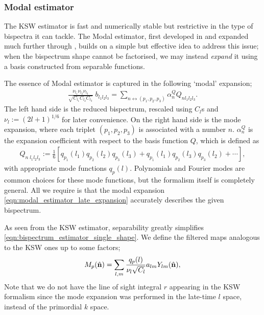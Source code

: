 \subsubsection*{Modal estimator}
The KSW estimator is fast and numerically stable but restrictive in the type of bispectra it can tackle. The Modal estimator, first developed in \cite{Fergusson2010general} and expanded much further through \cite{Fergusson2012,Fergusson2014,Shiraishi2014parityodd,Shiraishi2019cross}, builds on a simple but effective idea to address this issue; when the bispectrum shape cannot be factorised, we may instead \textit{expand} it using a basis constructed from separable functions.

The essence of Modal estimator is captured in the following `modal' expansion;
\begin{align}
	\frac{\nu_{l_1} \nu_{l_2} \nu_{l_3}}{\sqrt{C_{l_1} C_{l_2} C_{l_3}}} \; b_{l_1 l_2 l_3} = \sum_{n \leftrightarrow (p_1,p_2,p_3)} \alpha_n^Q Q_{n l_1 l_2 l_3}. \label{eqn:modal_estimator_late_expansion}
\end{align}
The left hand side is the reduced bispectrum, rescaled using $C_l$s and $\nu_l := (2l+1)^{1/6}$ for later convenience. On the right hand side is the mode expansion, where each triplet $(p_1,p_2,p_3)$ is associated with a number $n$. $\alpha_n^Q$ is the expansion coefficient with respect to the basis function $Q$, which is defined as
\begin{align}
	Q_{n \; l_1 l_2 l_3} := \frac{1}{6} \left[ q_{p_1}(l_1) q_{p_2}(l_2) q_{p_3}(l_3) + q_{p_1}(l_1) q_{p_2}(l_3) q_{p_3}(l_2) + \cdots \right],
\end{align}
with appropriate mode functions $q_p(l)$. Polynomials and Fourier modes are common choices for these mode functions, but the formalism itself is completely general. All we require is that the modal expansion \eqref{eqn:modal_estimator_late_expansion} accurately describes the given bispectrum.

As seen from the KSW estimator, separability greatly simplifies \eqref{eqn:bispectrum_estimator_single_shape}. We define the filtered maps analogous to the KSW ones up to some factors;
\begin{align}
	M_p (\hat{\mathbf{n}}) = \sum_{l,m} \frac{q_p(l)}{\nu_l \sqrt{C_l}} a_{lm} Y_{lm}(\hat{\mathbf{n}}), \label{eqn:modal_estimator_filtered_map}
\end{align}
Note that we do not have the line of sight integral $r$ appearing in the KSW formalism since the mode expansion was performed in the late-time $l$ space, instead of the primordial $k$ space.

